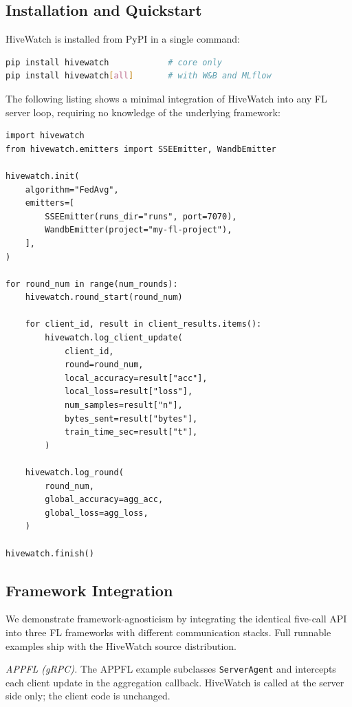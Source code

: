 
\subsection{Installation and Quickstart}

HiveWatch is installed from PyPI in a single command:

\begin{lstlisting}[language=bash,style=PythonStyle,caption={Installation.}]
pip install hivewatch            # core only
pip install hivewatch[all]       # with W&B and MLflow
\end{lstlisting}

The following listing shows a minimal integration of HiveWatch into any FL server loop, requiring no knowledge of the underlying framework:

\begin{lstlisting}[style=PythonStyle,caption={Minimal HiveWatch integration.}]
import hivewatch
from hivewatch.emitters import SSEEmitter, WandbEmitter

hivewatch.init(
    algorithm="FedAvg",
    emitters=[
        SSEEmitter(runs_dir="runs", port=7070),
        WandbEmitter(project="my-fl-project"),
    ],
)

for round_num in range(num_rounds):
    hivewatch.round_start(round_num)

    for client_id, result in client_results.items():
        hivewatch.log_client_update(
            client_id,
            round=round_num,
            local_accuracy=result["acc"],
            local_loss=result["loss"],
            num_samples=result["n"],
            bytes_sent=result["bytes"],
            train_time_sec=result["t"],
        )

    hivewatch.log_round(
        round_num,
        global_accuracy=agg_acc,
        global_loss=agg_loss,
    )

hivewatch.finish()
\end{lstlisting}

\subsection{Framework Integration}

We demonstrate framework-agnosticism by integrating the identical five-call API into three FL frameworks with different communication stacks. Full runnable examples ship with the HiveWatch source distribution.

\textit{APPFL (gRPC).} The APPFL example subclasses \texttt{ServerAgent} and intercepts each client update in the aggregation callback. HiveWatch is called at the server side only; the client code is unchanged.

